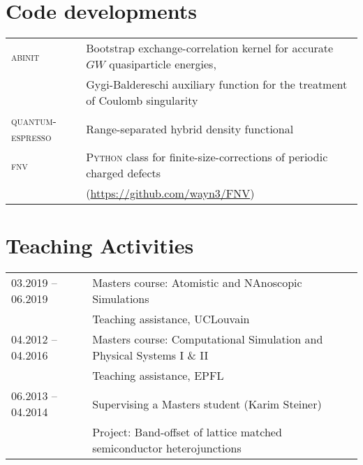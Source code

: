 \documentclass[a4paper, 11pt, DIV=15,headings=normal]{scrartcl}
\begin{document}
\section*{Code developments}
\begin{tabular}{ll}
\textsc{abinit}  & Bootstrap exchange-correlation kernel for accurate $GW$ quasiparticle energies, \\
                 & Gygi-Baldereschi auxiliary function for the treatment of
Coulomb singularity \\
\textsc{quantum-espresso} & Range-separated hybrid density functional \\
\textsc{fnv}     & \textsc{Python} class for finite-size-corrections of
periodic charged defects \\
                 & (\url{https://github.com/wayn3/FNV})
\\
\end{tabular} 

\section*{Teaching Activities}
\begin{tabular}{ll}
03.2019 -- 06.2019 & Masters course: Atomistic and NAnoscopic Simulations \\
                   & Teaching assistance, UCLouvain\\
04.2012 -- 04.2016 & Masters course: Computational Simulation and Physical Systems I \& II \\
                   & Teaching assistance, EPFL\\
06.2013 -- 04.2014 & Supervising a Masters student (Karim Steiner) \\
                   & Project: Band-offset of lattice matched semiconductor heterojunctions 
\end{tabular}
\end{document}
